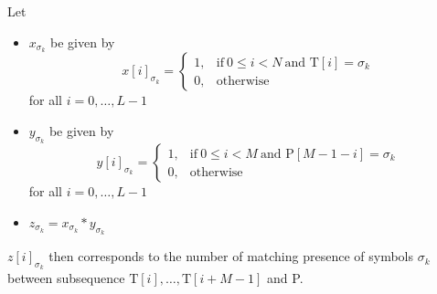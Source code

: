 Let
\begin{itemize}
    \item $x_{\sigma_k}$ be given by
    	\begin{equation*}
			x[i]_{\sigma_k} =
			\begin{cases}
				1, & \mathrm{if}\ 0 \leq i < N\ \text{and T}[i]=\sigma_k\\
				0, & \mathrm{otherwise} 
			\end{cases}
		\end{equation*}
		for all $i=0,\ldots,L-1$
	\item $y_{\sigma_k}$ be given by
    	\begin{equation*}
			y[i]_{\sigma_k} =
			\begin{cases}
				1, & \mathrm{if}\ 0 \leq i < M\ \text{and P}[M-1-i]=\sigma_k\\
				0, & \mathrm{otherwise} 
			\end{cases}
		\end{equation*}
		for all $i=0,\ldots,L-1$
	\item $z_{\sigma_k} = x_{\sigma_k}*y_{\sigma_k}$
\end{itemize}
$z[i]_{\sigma_k}$ then corresponds to the number of matching presence of symbols $\sigma_k$ between subsequence $\mathrm{T}[i],\ldots,\mathrm{T}[i+M-1]$ and P.

